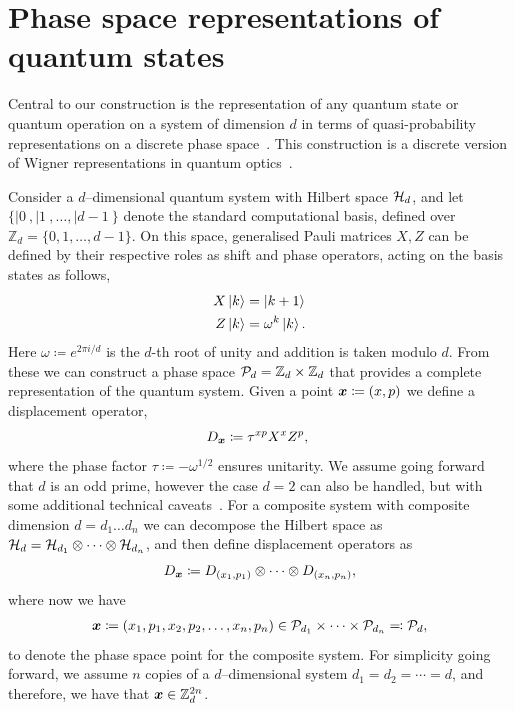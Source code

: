 \documentclass[pra,
aps,
twocolumn,
superscriptaddress,
groupedaddress,
nofootinbib,
reprint
]{revtex4-1}
\begin{document}
\section{Phase space representations of quantum states}
\label{sec:ps}

Central to our construction is the representation of any quantum state or quantum operation on a system of dimension $d$ in terms of quasi-probability representations on a discrete phase space~\cite{Ferrie_2008}. This construction is a discrete version of Wigner representations in quantum optics~\cite{Wigner_1932, Vourdas_2004}.

Consider a $d$--dimensional quantum system with Hilbert space $\H_d$, and let $\{ |0\>, |1\>, \dots , |d-1\>\}$ denote the standard computational basis, defined over $\mathbb{Z}_d = \{ 0, 1, \dots,d-1 \}$. On this space, generalised Pauli matrices $X, Z$ can be defined by their respective roles as shift and phase operators, acting on the basis states as follows,
\begin{align}
    X \ket{k} &= \ket{k + 1} \label{eq:xpauli}\\
	Z \ket{k} &= \omega^k \ket{k}. \label{eq:zpauli}
\end{align}
Here $\omega \coloneqq e^{2\pi i/d}$ is the $d$-th root of unity and addition is taken modulo $d$. From these we can construct a phase space $\cal{P}_d = \mathbb{Z}_d \times \mathbb{Z}_d$ that provides a complete representation of the quantum system. Given a point $\bmx \coloneqq (x, p)$ we define a displacement operator, 
\begin{equation}\label{eq:ddef}
    D_{\bmx} \coloneqq \tau^{x p} X^{x} Z^{p},\ 
\end{equation}
where the phase factor $\tau \coloneqq -\omega^{1/2}$ ensures unitarity. We assume going forward that $d$ is an odd prime, however the case $d=2$ can also be handled, but with some additional technical caveats~\cite{Appleby_2005}. For a composite system with composite dimension $d = d_1 \dots d_n$ we can decompose the Hilbert space as $\cal{H}_d = \cal{H}_{d_1} \otimes \dots \otimes \cal{H}_{d_n}$, and then define displacement operators as
\begin{equation}\label{eq:composited}
    D_{\bmx} \coloneqq D_{(x_1, p_1)} \otimes \dots \otimes D_{(x_n, p_n)},
\end{equation}
where now we have
\begin{align*}
	\bmx \coloneqq (x_1, p_1, x_2, p_2, \dots, x_n, p_n) \in \cal{P}_{d_1} \times \dots \times \cal{P}_{d_n} \eqqcolon  \cal{P}_d,
\end{align*}
to denote the phase space point for the composite system. 
For simplicity going forward, we assume $n$ copies of a $d$--dimensional system $d_1=d_2 = \cdots = d$, and therefore, we have that $\x \in \mathbb{Z}_d^{2n}$.
\end{document}
